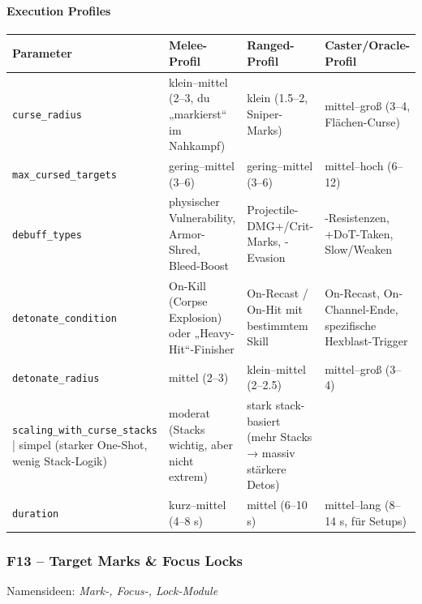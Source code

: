 \paragraph{Execution Profiles}{}
\scriptsize %
\begin{tabular}{p{3cm} | p{4cm} | p{4cm} | p{4cm}}
	Parameter              & Melee-Profil                                             & Ranged-Profil                                               & Caster/Oracle-Profil                                       \\
	\hline
	\texttt{curse\_radius}         & klein–mittel (2–3, du „markierst“ im Nahkampf)          & klein (1.5–2, Sniper-Marks)                                & mittel–groß (3–4, Flächen-Curse)                           \\
	\texttt{max\_cursed\_targets}   & gering–mittel (3–6)                                     & gering–mittel (3–6)                                        & mittel–hoch (6–12)                                         \\
	\texttt{debuff\_types}         & physischer Vulnerability, Armor-Shred, Bleed-Boost      & Projectile-DMG+/Crit-Marks, -Evasion                       & -Resistenzen, +DoT-Taken, Slow/Weaken                      \\
	\texttt{detonate\_condition}   & On-Kill (Corpse Explosion) oder „Heavy-Hit“-Finisher    & On-Recast / On-Hit mit bestimmtem Skill                    & On-Recast, On-Channel-Ende, spezifische Hexblast-Trigger   \\
	\texttt{detonate\_radius}      & mittel (2–3)                                            & klein–mittel (2–2.5)                                       & mittel–groß (3–4)                                          \\
	\texttt{scaling\_with\_curse\_stacks} | simpel (starker One-Shot, wenig Stack-Logik)      & moderat (Stacks wichtig, aber nicht extrem)                & stark stack-basiert (mehr Stacks → massiv stärkere Detos) \\
	\texttt{duration}             & kurz–mittel (4–8 s)                                     & mittel (6–10 s)                                            & mittel–lang (8–14 s, für Setups)                          \\
	\hline
\end{tabular}
\normalsize
\subsubsection{F13 – Target Marks \& Focus Locks}
Namensideen: \emph{Mark-, Focus-, Lock-Module}

